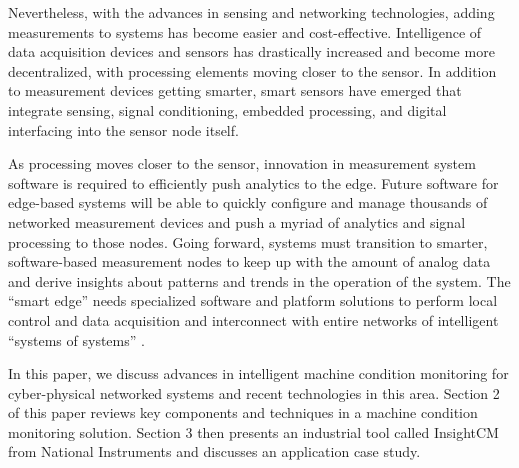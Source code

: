 Nevertheless, with the advances in sensing and networking technologies, adding measurements to systems has become easier and cost-effective. 
Intelligence of data acquisition devices and sensors has drastically increased and become more decentralized, with processing elements moving closer to the sensor.
In addition to measurement devices getting smarter, smart sensors have emerged that integrate sensing, signal conditioning, embedded processing, and digital interfacing into the sensor node itself. 

As processing moves closer to the sensor, innovation in measurement system software is required to efficiently push analytics to the edge. 
Future software for edge-based systems will be able to quickly configure and manage thousands of networked measurement devices and push a myriad of analytics and signal processing to those nodes. 
Going forward, systems must transition to smarter, software-based measurement nodes to keep up with the amount of analog data and derive insights about patterns and trends in the operation of the system.
The ``smart edge'' needs specialized software and platform solutions to perform local control and data acquisition and interconnect with entire networks of intelligent ``systems of systems'' \cite{NITrendWatch2016}.

In this paper, we discuss advances in intelligent machine condition monitoring for cyber-physical networked systems and recent technologies in this area. 
Section 2 of this paper reviews key components and techniques in a machine condition monitoring solution. 
Section 3 then presents an industrial tool called InsightCM from National Instruments and discusses an application case study.




